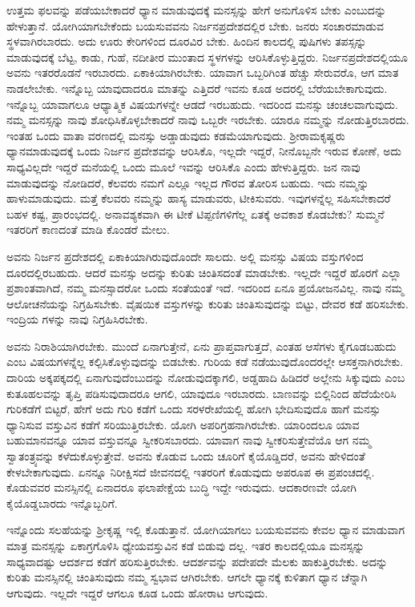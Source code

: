 ಉತ್ತಮ ಫಲವನ್ನು ಪಡೆಯಬೇಕಾದರೆ ಧ್ಯಾನ ಮಾಡುವುದಕ್ಕೆ ಮನಸ್ಸನ್ನು ಹೇಗೆ ಅನುಗೊಳಿಸ ಬೇಕು ಎಂಬುದನ್ನು ಹೇಳುತ್ತಾನೆ. ಯೋಗಿಯಾಗಬೇಕೆಂದು ಬಯಸುವವನು ನಿರ್ಜನಪ್ರದೇಶದಲ್ಲಿರ ಬೇಕು. ಜನರು ಸಂಚಾರಮಾಡುವ ಸ್ಥಳವಾಗಿರಬಾರದು. ಅದು ಊರು ಕೇರಿಗಳಿಂದ ದೂರವಿರ ಬೇಕು. ಹಿಂದಿನ ಕಾಲದಲ್ಲಿ ಪುಷಿಗಳು ತಪಸ್ಸನ್ನು ಮಾಡುವುದಕ್ಕೆ ಬೆಟ್ಟ, ಕಾಡು, ಗುಹೆ, ನದೀತೀರ ಮುಂತಾದ ಸ್ಥಳಗಳನ್ನು ಆರಿಸಿಕೊಳ್ಳುತ್ತಿದ್ದರು. ನಿರ್ಜನಪ್ರದೇಶದಲ್ಲಿಯೂ ಅವನು ಇತರರೊಡನೆ ಇರಬಾರದು. ಏಕಾಕಿಯಾಗಿರಬೇಕು. ಯಾವಾಗ ಒಬ್ಬರಿಗಿಂತ ಹೆಚ್ಚು ಸೇರುವರೊ, ಆಗ ಮಾತ ನಾಡಲೇಬೇಕು. ಇನ್ನೊಬ್ಬ ಯಾವುದಾದರೂ ಮಾತನ್ನು ಎತ್ತಿದರೆ ಇವನು ಕೂಡ ಅದರಲ್ಲಿ ಬೆರೆಯಬೇಕಾಗುವುದು. ಇನ್ನೊಬ್ಬ ಯಾವಾಗಲೂ ಆಧ್ಯಾತ್ಮಿಕ ವಿಷಯಗಳನ್ನೇ ಆಡದೆ ಇರಬಹುದು. ಇದರಿಂದ ಮನಸ್ಸು ಚಂಚಲವಾಗುವುದು. ನಮ್ಮ ಮನಸ್ಸನ್ನು ನಾವು ಶೋಧಿಸಿಕೊಳ್ಳಬೇಕಾದರೆ ನಾವು ಒಬ್ಬರೇ ಇರಬೇಕು. ಯಾರೂ ನಮ್ಮನ್ನು ನೋಡುತ್ತಿರಬಾರದು. ಇಂತಹ ಒಂದು ವಾತಾ ವರಣದಲ್ಲಿ ಮನಸ್ಸು ಅಡ್ಡಾಡುವುದು ಕಡಮೆಯಾಗುವುದು. ಶ‍್ರೀರಾಮಕೃಷ್ಣರು ಧ್ಯಾನಮಾಡುವುದಕ್ಕೆ ಒಂದು ನಿರ್ಜನ ಪ್ರದೇಶವನ್ನು ಆರಿಸಿಕೊ, ಇಲ್ಲದೇ ಇದ್ದರೆ, ನೀನೊಬ್ಬನೇ ಇರುವ ಕೋಣೆ, ಅದು ಸಾಧ್ಯವಿಲ್ಲದೇ ಇದ್ದರೆ ಮನೆಯಲ್ಲಿ ಒಂದು ಮೂಲೆ ಇವನ್ನು ಆರಿಸಿಕೊ ಎಂದು ಹೇಳುತ್ತಿದ್ದರು. ಜನ ನಾವು ಮಾಡುವುದನ್ನು ನೋಡಿದರೆ, ಕೆಲವರು ನಮಗೆ ಎಲ್ಲೂ ಇಲ್ಲದ ಗೌರವ ತೋರಿಸ ಬಹುದು. ಇದು ನಮ್ಮನ್ನು ಹಾಳುಮಾಡುವುದು. ಮತ್ತೆ ಕೆಲವರು ನಮ್ಮನ್ನು ಹಾಸ್ಯ ಮಾಡುವರು, ಟೀಕಿಸುವರು. ಇವುಗಳನ್ನೆಲ್ಲ ಸಹಿಸಬೇಕಾದರೆ ಬಹಳ ಕಷ್ಟ, ಪ್ರಾರಂಭದಲ್ಲಿ. ಅನಾವಶ್ಯಕವಾಗಿ ಈ ಟೀಕೆ ಟಿಪ್ಪಣಿಗಳಿಗೆಲ್ಲ ಏತಕ್ಕೆ ಅವಕಾಶ ಕೊಡಬೇಕು? ಸುಮ್ಮನೆ ಇತರರಿಗೆ ಕಾಣದಂತೆ ಮಾಡಿ ಕೊಂಡರೆ ಮೇಲು.

ಅವನು ನಿರ್ಜನ ಪ್ರದೇಶದಲ್ಲಿ ಏಕಾಕಿಯಾಗಿರುವುದೊಂದೇ ಸಾಲದು. ಅಲ್ಲಿ ಮನಸ್ಸು ವಿಷಯ ವಸ್ತುಗಳಿಂದ ದೂರದಲ್ಲಿರಬಹುದು. ಆದರೆ ಮನಸ್ಸು ಅದನ್ನು ಕುರಿತು ಚಿಂತಿಸದಂತೆ ಮಾಡಬೇಕು. ಇಲ್ಲದೇ ಇದ್ದರೆ ಹೊರಗೆ ಎಲ್ಲಾ ಪ್ರಶಾಂತವಾಗಿದೆ, ನಮ್ಮ ಮನಸ್ಸಾದರೋ ಒಂದು ಸಂತೆಯಂತೆ ಇದೆ. ಇದರಿಂದ ಏನೂ ಪ್ರಯೋಜನವಿಲ್ಲ. ನಾವು ನಮ್ಮ ಆಲೋಚನೆಯನ್ನು ನಿಗ್ರಹಿಸಬೇಕು. ವೈಷಯಿಕ ವಸ್ತುಗಳನ್ನು ಕುರಿತು ಚಿಂತಿಸುವುದನ್ನು ಬಿಟ್ಟು, ದೇವರ ಕಡೆ ಹರಿಸಬೇಕು. ಇಂದ್ರಿಯ ಗಳನ್ನು ನಾವು ನಿಗ್ರಹಿಸಿರಬೇಕು.

ಅವನು ನಿರಾಶಿಯಾಗಿರಬೇಕು. ಮುಂದೆ ಏನಾಗುತ್ತೇನೆ, ಏನು ಪ್ರಾಪ್ತವಾಗುತ್ತದೆ, ಎಂತಹ ಆಸೆಗಳು ಕೈಗೂಡಬಹುದು ಎಂಬ ವಿಷಯಗಳನ್ನೆಲ್ಲ ಕಲ್ಪಿಸಿಕೊಳ್ಳುವುದನ್ನು ಬಿಡಬೇಕು. ಗುರಿಯ ಕಡೆ ನಡೆಯುವುದೊಂದರಲ್ಲೇ ಆಸಕ್ತನಾಗಿರಬೇಕು. ದಾರಿಯ ಅಕ್ಕಪಕ್ಕದಲ್ಲಿ ಏನಾಗುವುದೆಂಬುದನ್ನು ನೋಡುವುದಕ್ಕಾಗಲಿ, ಅಡ್ಡಹಾದಿ ಹಿಡಿದರೆ ಅಲ್ಲೇನು ಸಿಕ್ಕುವುದು ಎಂಬ ಕುತೂಹಲವನ್ನು ತೃಪ್ತಿ ಪಡಿಸುವುದಾದರೂ ಆಗಲಿ, ಯಾವುದೂ ಇರಬಾರದು. ಬಾಣವನ್ನು ಬಿಲ್ಲಿನಿಂದ ಹೆದೆಯೇರಿಸಿ ಗುರಿಕಡೆಗೆ ಬಿಟ್ಟರೆ, ಹೇಗೆ ಅದು ಗುರಿ ಕಡೆಗೆ ಒಂದು ಸರಳರೇಖೆಯಲ್ಲಿ ಹೋಗಿ ಭೇದಿಸುವುದೊ ಹಾಗೆ ಮನಸ್ಸು ಧ್ಯಾನಿಸುವ ವಸ್ತುವಿನ ಕಡೆಗೆ ಸರಿಯುತ್ತಿರಬೇಕು. ಯೋಗಿ ಅಪರಿಗ್ರಹನಾಗಿರಬೇಕು. ಯಾರಿಂದಲೂ ಯಾವ ಬಹುಮಾನವನ್ನೂ ಯಾವ ವಸ್ತುವನ್ನೂ ಸ್ವೀಕರಿಸಬಾರದು. ಯಾವಾಗ ನಾವು ಸ್ವೀಕರಿಸುತ್ತೇವೆಯೊ ಆಗ ನಮ್ಮ ಸ್ವಾತಂತ್ರ್ಯವನ್ನು ಕಳೆದುಕೊಳ್ಳುತ್ತೇವೆ. ಅವನು ಕೊಡುವ ಒಂದು ಚೂರಿಗೆ ಕೈಯೊಡ್ಡಿದರೆ, ಅವನು ಹೇಳಿದಂತೆ ಕೇಳಬೇಕಾಗುವುದು. ಏನನ್ನೂ ನಿರೀಕ್ಷಿಸದೆ ಜೀವನದಲ್ಲಿ ಇತರರಿಗೆ ಕೊಡುವುದು ಅಪರೂಪ ಈ ಪ್ರಪಂಚದಲ್ಲಿ. ಕೊಡುವವರ ಮನಸ್ಸಿನಲ್ಲಿ ಏನಾದರೂ ಫಲಾಪೇಕ್ಷೆಯ ಬುದ್ಧಿ ಇದ್ದೇ ಇರುವುದು. ಆದಕಾರಣವೇ ಯೋಗಿ ಕೈಯೊಡ್ಡಬಾರದು ಇನ್ನೊಬ್ಬರಿಗೆ.

ಇನ್ನೊಂದು ಸಲಹೆಯನ್ನು ಶ‍್ರೀಕೃಷ್ಣ ಇಲ್ಲಿ ಕೊಡುತ್ತಾನೆ. ಯೋಗಿಯಾಗಲು ಬಯಸುವವನು ಕೇವಲ ಧ್ಯಾನ ಮಾಡುವಾಗ ಮಾತ್ರ ಮನಸ್ಸನ್ನು ಏಕಾಗ್ರಗೊಳಿಸಿ ಧ್ಯೇಯವಸ್ತುವಿನ ಕಡೆ ಬಿಡುವು ದಲ್ಲ. ಇತರ ಕಾಲದಲ್ಲಿಯೂ ಮನಸ್ಸನ್ನು ಸಾಧ್ಯವಾದಷ್ಟು ಆದರ್ಶದ ಕಡೆಗೆ ಹರಿಸುತ್ತಿರಬೇಕು. ಆದರ್ಶವನ್ನು ಪದೇಪದೇ ಮೆಲಕು ಹಾಕುತ್ತಿರಬೇಕು. ಅದನ್ನು ಕುರಿತು ಮನಸ್ಸಿನಲ್ಲಿ ಚಿಂತಿಸುವುದು ನಮ್ಮ ಸ್ವಭಾವ ಆಗಿರಬೇಕು. ಆಗಲೇ ಧ್ಯಾನಕ್ಕೆ ಕುಳಿತಾಗ ಧ್ಯಾನ ಚೆನ್ನಾಗಿ ಆಗುವುದು. ಇಲ್ಲದೇ ಇದ್ದರೆ ಆಗಲೂ ಕೂಡ ಒಂದು ಹೋರಾಟ ಆಗುವುದು.

